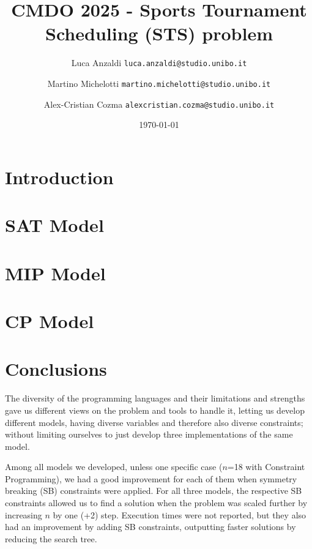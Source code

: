 \documentclass{article}
\title{CMDO 2025 - Sports Tournament Scheduling
(STS) problem}
\author{%
Luca Anzaldi \texttt{luca.anzaldi@studio.unibo.it} \and
Martino Michelotti \texttt{martino.michelotti@studio.unibo.it} \and
Alex-Cristian Cozma \texttt{alexcristian.cozma@studio.unibo.it}
}
\date{\today}
\begin{document}
\maketitle

\section{Introduction}



\section{SAT Model}




\section{MIP Model}




\clearpage
\section{CP Model}




\section{Conclusions}
The diversity of the programming languages and their limitations and strengths gave us different views on the problem and tools to handle it, letting us develop different models, having diverse variables and therefore also diverse constraints; without limiting ourselves to just develop three implementations of the same model. 

Among all models we developed, unless one specific case ($n$=18 with Constraint Programming), we had a good improvement for each of them when symmetry breaking (SB) constraints were applied.
For all three models, the respective SB constraints allowed us to find a solution when the problem was scaled further by increasing $n$ by one (+2) step.
Execution times were not reported, but they also had an improvement by adding SB constraints, outputting faster solutions by reducing the search tree.
\end{document}
